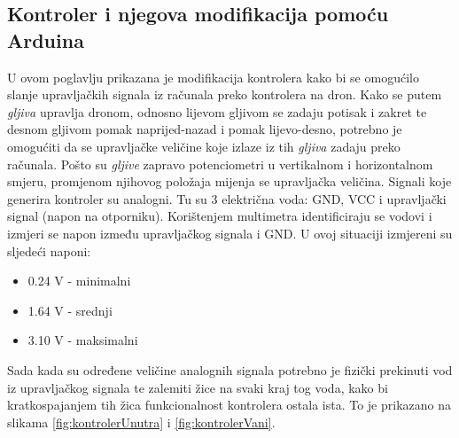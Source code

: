 \documentclass[times, utf8, diplomski]{fer}
\begin{document}
\subsection{Kontroler i njegova modifikacija pomoću Arduina}\label{sec:kontroler}
U ovom poglavlju prikazana je modifikacija kontrolera kako bi se omogućilo slanje upravljačkih signala iz računala preko kontrolera na dron. Kako se putem \emph{gljiva} upravlja dronom, odnosno lijevom gljivom se zadaju potisak  i zakret  te desnom gljivom pomak naprijed-nazad i pomak lijevo-desno, potrebno je omogućiti da se upravljačke veličine koje izlaze iz tih \emph{gljiva} zadaju preko računala. Pošto su \emph{gljive} zapravo potenciometri u vertikalnom i horizontalnom smjeru, promjenom njihovog položaja mijenja se  upravljačka veličina. Signali koje generira kontroler su analogni. Tu su 3 električna voda: GND, VCC i upravljački signal (napon na otporniku). Korištenjem multimetra identificiraju se vodovi i izmjeri se napon između upravljačkog signala i GND. U ovoj situaciji izmjereni su sljedeći naponi:
\begin{itemize}
\item 0.24 V - minimalni
\item 1.64 V - srednji
\item 3.10 V - maksimalni
\end{itemize}
Sada kada su određene veličine analognih signala potrebno je fizički prekinuti vod iz upravljačkog signala te zalemiti žice na svaki kraj tog voda, kako bi kratkospajanjem tih žica funkcionalnost kontrolera ostala ista.  To je prikazano na slikama  \ref{fig:kontrolerUnutra} i \ref{fig:kontrolerVani}.
\end{document}
